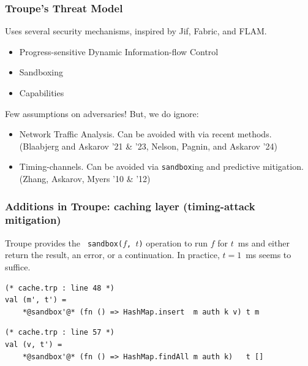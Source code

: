 \documentclass[english, aspectratio=169]{beamer}
\begin{document}
\begin{frame}
  \frametitle{Troupe's Threat Model}

  Uses several security mechanisms, inspired by Jif, Fabric, and FLAM.
  \begin{itemize}
  \item Progress-sensitive Dynamic Information-flow Control
  \item Sandboxing
  \item Capabilities
  \end{itemize}

  Few assumptions on adversaries! But, we do ignore:
  \begin{itemize}
  \item Network Traffic Analysis. Can be avoided with via recent methods.\\
    {\footnotesize (Blaabjerg and Askarov '21 \& '23, Nelson, Pagnin, and Askarov '24)}
  \item Timing-channels. Can be avoided via \texttt{sandbox}ing and predictive
    mitigation.
    {\footnotesize (Zhang, Askarov, Myers '10 \& '12)}
  \end{itemize}
\end{frame}

\blankframe

\begin{frame}[fragile]
  \frametitle{Additions in Troupe: caching layer (timing-attack mitigation)}

  Troupe provides the \texttt{{\color{blue} sandbox}($f$, $t$)} operation to run
  $f$ for $t$~ms and either return the result, an error, or a continuation. In
  practice, $t = 1$~ms seems to suffice.

  \begin{lstlisting}[language=troupe, numbers=none]
(* cache.trp : line 48 *)
val (m', t') =
    *@sandbox'@* (fn () => HashMap.insert  m auth k v) t m
  \end{lstlisting}
  \begin{lstlisting}[language=troupe, numbers=none]
(* cache.trp : line 57 *)
val (v, t') =
    *@sandbox'@* (fn () => HashMap.findAll m auth k)   t []
  \end{lstlisting}
\end{frame}

\blankframe
\end{document}
